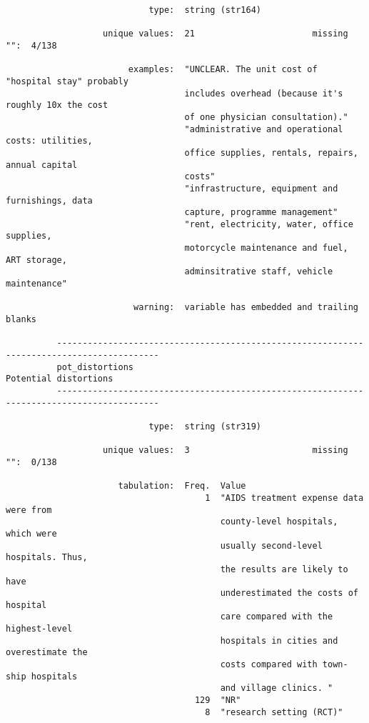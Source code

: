 \documentclass{article}
\begin{document}
\begin{verbatim}
                            type:  string (str164)
          
                   unique values:  21                       missing "":  4/138
          
                        examples:  "UNCLEAR. The unit cost of "hospital stay" probably
                                   includes overhead (because it's roughly 10x the cost
                                   of one physician consultation)."
                                   "administrative and operational costs: utilities,
                                   office supplies, rentals, repairs, annual capital
                                   costs"
                                   "infrastructure, equipment and furnishings, data
                                   capture, programme management"
                                   "rent, electricity, water, office supplies,
                                   motorcycle maintenance and fuel, ART storage,
                                   adminsitrative staff, vehicle maintenance"
          
                         warning:  variable has embedded and trailing blanks
          
          ------------------------------------------------------------------------------------------
          pot_distortions                                                      Potential distortions
          ------------------------------------------------------------------------------------------
          
                            type:  string (str319)
          
                   unique values:  3                        missing "":  0/138
          
                      tabulation:  Freq.  Value
                                       1  "AIDS treatment expense data were from
                                          county-level hospitals, which were
                                          usually second-level hospitals. Thus,
                                          the results are likely to have
                                          underestimated the costs of hospital
                                          care compared with the highest-level
                                          hospitals in cities and overestimate the
                                          costs compared with town- ship hospitals
                                          and village clinics. "
                                     129  "NR"
                                       8  "research setting (RCT)"
          

\end{verbatim}
\end{document}
